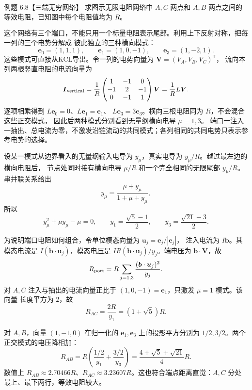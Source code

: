\begin{origexamplebox}{例题 6.8【三端无穷网络】}
求图示无限电阻网络中 $A,C$ 两点和 $A,B$ 两点之间的等效电阻，已知图中每个电阻值均为 $R$。
\threeRailProblemFigure
{}
\end{origexamplebox}



\begin{xesolution}
这个网络有三个端口，不能只用一个标量电阻表示尾部。利用上下反射对称，把每一列的三个电势分解成
彼此独立的三种横向模式：
\[
  \boldsymbol e_0=(1,1,1),\qquad
  \boldsymbol e_1=(1,0,-1),\qquad
  \boldsymbol e_3=(1,-2,1).
\]
这些模式可直接从KCL导出。令一列的电势向量为 $\boldsymbol V=(V_A,V_B,V_C)^{\mathsf T}$，
流向本列两根竖直电阻的电流向量为
\[
 \boldsymbol I_{\rm vertical}=\frac1R
 \begin{pmatrix}1&-1&0\\-1&2&-1\\0&-1&1\end{pmatrix}\boldsymbol V
 =\frac1R L\boldsymbol V.
\]
逐项相乘得到 $L\boldsymbol e_0=0$、$L\boldsymbol e_1=\boldsymbol e_1$、
$L\boldsymbol e_3=3\boldsymbol e_3$。横向三根电阻同为 $R$，不会混合这些正交模式，
因此后两种模式分别看到无量纲横向电导 $\mu=1,3$。
端口一注入一抽出、总电流为零，不激发沿链流动的共同模式；各列相同的共同电势只表示参考电势的选择。

\threeRailModesFigure
{}

设某一模式从边界看入的无量纲输入电导为 $y_\mu$，真实电导为 $y_\mu/R$。越过最左边的横向电阻后，
节点处同时接有横向电导 $\mu/R$ 和一个完全相同的无限尾部 $y_\mu/R$。串并联关系给出
\[
  y_\mu=\frac{\mu+y_\mu}{1+\mu+y_\mu},
\]
所以
\[
  y_\mu^2+\mu y_\mu-\mu=0,
  \qquad
  y_1=\frac{\sqrt5-1}{2},
  \qquad
  y_3=\frac{\sqrt{21}-3}{2}.
\]

为说明端口电阻如何组合，令单位模态向量为 $\boldsymbol u_j=\boldsymbol e_j/|\boldsymbol e_j|$，
注入电流为 $I\boldsymbol b$。其模态电流是 $I(\boldsymbol b\cdot\boldsymbol u_j)$，模态电压是
$IR(\boldsymbol b\cdot\boldsymbol u_j)/y_j$。端电压为 $\boldsymbol b\cdot\boldsymbol V$，故
\[
 R_{\rm port}=R\sum_{j=1,3}\frac{(\boldsymbol b\cdot\boldsymbol u_j)^2}{y_j}.
\]
对 $A,C$ 注入与抽出的电流向量正比于 $(1,0,-1)=\boldsymbol e_1$，只激发 $\mu=1$ 模式。该向量
长度平方为 $2$，故
\[
  \boxed{R_{AC}=\frac{2R}{y_1}=(1+\sqrt5)R}.
\]

对 $A,B$，向量 $(1,-1,0)$ 在归一化的 $\boldsymbol e_1,\boldsymbol e_3$ 上的投影平方分别为
$1/2,3/2$。两个正交模式的电压降相加：
\[
  R_{AB}=R\left(\frac{1/2}{y_1}+\frac{3/2}{y_3}\right)
  =\boxed{\frac{4+\sqrt5+\sqrt{21}}4R}.
\]
数值上 $R_{AB}\approx2.70466R$、$R_{AC}\approx3.23607R$。这也符合端点距离直觉：$A,C$ 分处
最上、最下两行，等效电阻较大。
\end{xesolution}

